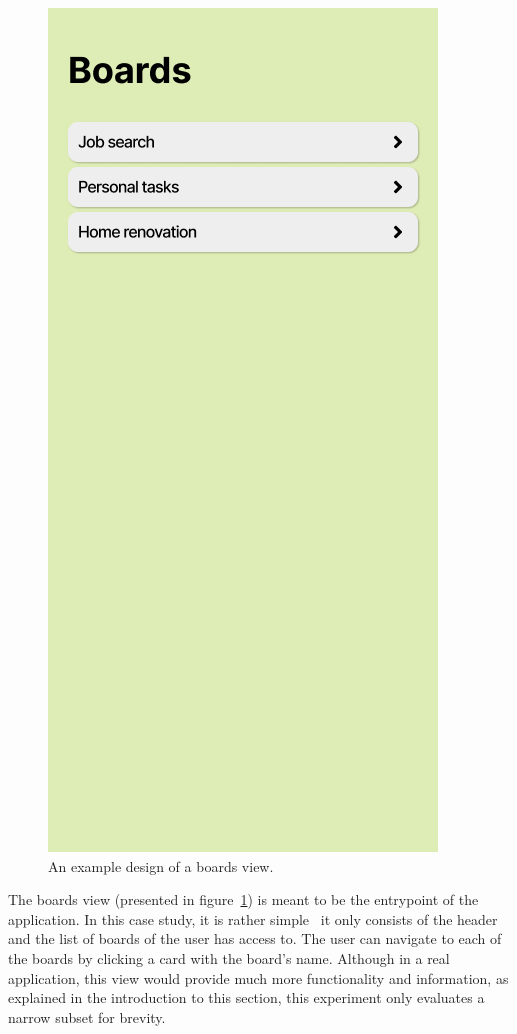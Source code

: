 \begin{figure}
    \centering
    \includegraphics[height=0.4\textheight]{./3-research-methodology/boards-view}
    \caption{An example design of a boards view.}
    \label{fig:3-4-boards-view}
\end{figure}

The boards view (presented in figure~\ref{fig:3-4-boards-view}) is meant to be the entrypoint of the application.
In this case study, it is rather simple \textendash\ it only consists of the header and the list of boards of the user has access to.
The user can navigate to each of the boards by clicking a card with the board's name.
Although in a real application, this view would provide much more functionality and information, as explained in the introduction to this section, this experiment only evaluates a narrow subset for brevity.

